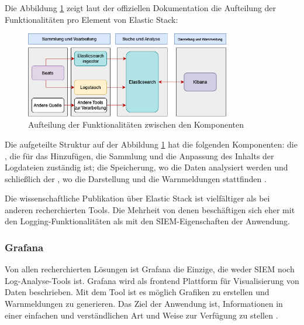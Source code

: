 Die Abbildung \ref{fig:ElasticKomponenten} zeigt laut der offiziellen Dokumentation die Aufteilung der Funktionalitäten pro Element von Elastic Stack:

\begin{figure}[H]
   \centering
   \includegraphics[width=0.8\textwidth]{assets/ELK_Architektur.png}
   \caption[Aufteilung der Funktionalitäten zwischen den Komponenten]
   {Aufteilung der Funktionalitäten zwischen den Komponenten}
   \label{fig:ElasticKomponenten}
   \centering
\end{figure}

Die aufgeteilte Struktur auf der Abbildung \ref{fig:ElasticKomponenten} hat die folgenden Komponenten: die , die für das Hinzufügen, die Sammlung und die Anpassung des Inhalts der Logdateien zuständig ist; die Speicherung, wo die Daten analysiert werden und schließlich der , wo die Darstellung und die Warnmeldungen stattfinden \citep{elastic_docs}.


Die wissenschaftliche Publikation über Elastic Stack ist vielfältiger als bei anderen recherchierten Tools. Die Mehrheit von denen beschäftigen sich eher mit den Logging-Funktionalitäten als mit den \gls{SIEM}-Eigenschaften der Anwendung.

\subsubsection{Grafana}
Von allen recherchierten Lösungen ist Grafana die Einzige, die weder \gls{SIEM} noch Log-Analyse-Tools ist. Grafana wird als \gls{frontend} Plattform für Visualisierung von Daten beschrieben. Mit dem Tool ist es möglich Grafiken zu erstellen und Warnmeldungen zu generieren. Das Ziel der Anwendung ist, Informationen in einer einfachen und verständlichen Art und Weise zur Verfügung zu stellen \citep{redhat_grafana}.

